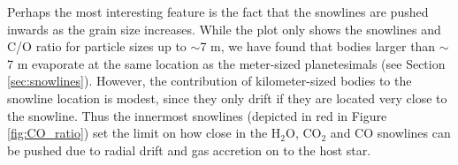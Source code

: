 \documentclass[apj]{emulateapj}
\begin{document}
Perhaps the most interesting feature is the fact that the snowlines are pushed inwards as the grain size increases. While the plot only shows the snowlines and C/O ratio for particle sizes up to $\sim$7 m, we have found that %
bodies larger than $\sim$7 m evaporate at the same location as the meter-sized planetesimals (see Section \ref{sec:snowlines}). However, the contribution of kilometer-sized bodies to the snowline location is modest, since they only drift if they are located very close to the snowline.
Thus the innermost snowlines (depicted in red in Figure \ref{fig:CO_ratio}) set the limit on how close in the H$_2$O, CO$_2$ and CO snowlines can be pushed due to radial drift and gas accretion on to the host star. %

\end{document}
